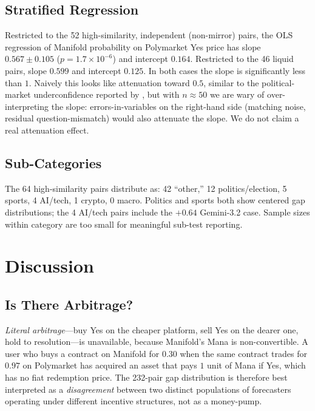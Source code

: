 \documentclass{article}
\begin{document}
\subsection{Stratified Regression}

Restricted to the 52 high-similarity, independent (non-mirror) pairs, the OLS regression of Manifold probability on Polymarket Yes price has slope $0.567 \pm 0.105$ ($p = 1.7\times 10^{-6}$) and intercept $0.164$. Restricted to the 46 liquid pairs, slope $0.599$ and intercept $0.125$. In both cases the slope is significantly less than $1$. Naively this looks like attenuation toward $0.5$, similar to the political-market underconfidence reported by \citet{le2026decomposing}, but with $n \approx 50$ we are wary of over-interpreting the slope: errors-in-variables on the right-hand side (matching noise, residual question-mismatch) would also attenuate the slope. We do not claim a real attenuation effect.

\subsection{Sub-Categories}

The 64 high-similarity pairs distribute as: 42 ``other,'' 12 politics/election, 5 sports, 4 AI/tech, 1 crypto, 0 macro. Politics and sports both show centered gap distributions; the 4 AI/tech pairs include the $+0.64$ Gemini-3.2 case. Sample sizes within category are too small for meaningful sub-test reporting.

\section{Discussion}

\subsection{Is There Arbitrage?}

\emph{Literal arbitrage}---buy Yes on the cheaper platform, sell Yes on the dearer one, hold to resolution---is unavailable, because Manifold's Mana is non-convertible. A user who buys a contract on Manifold for $0.30$ when the same contract trades for $0.97$ on Polymarket has acquired an asset that pays $1$ unit of Mana if Yes, which has no fiat redemption price. The 232-pair gap distribution is therefore best interpreted as a \emph{disagreement} between two distinct populations of forecasters operating under different incentive structures, not as a money-pump.
\end{document}
